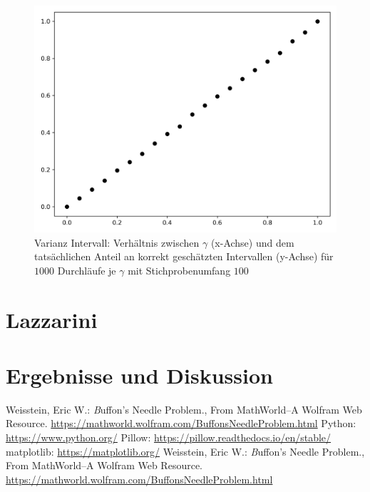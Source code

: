 \documentclass[10pt,twocolumn]{scrartcl}
\begin{document}
		\begin{figure}[H]
			\centering
			\includegraphics[width=0.9\columnwidth]{images/var_interval.png}
			\caption{Varianz Intervall: Verhältnis zwischen $\gamma$ (x-Achse) und dem tatsächlichen Anteil an korrekt geschätzten Intervallen (y-Achse) für $1000$ Durchläufe je $\gamma$ mit Stichprobenumfang $100$}
			\label{fig_var_interval_dot}
		\end{figure}

\section{Lazzarini}

\section*{Ergebnisse und Diskussion}

\begin{thebibliography}{99}
	Weisstein, Eric W.: {\textit Buffon's Needle Problem.}, From MathWorld--A Wolfram Web Resource. \url{https://mathworld.wolfram.com/BuffonsNeedleProblem.html}
	Python: \url{https://www.python.org/}
	Pillow: \url{https://pillow.readthedocs.io/en/stable/}
	matplotlib: \url{https://matplotlib.org/}
	Weisstein, Eric W.: {\textit Buffon's Needle Problem.}, From MathWorld--A Wolfram Web Resource. \url{https://mathworld.wolfram.com/BuffonsNeedleProblem.html}
\end{thebibliography}
\end{document}
